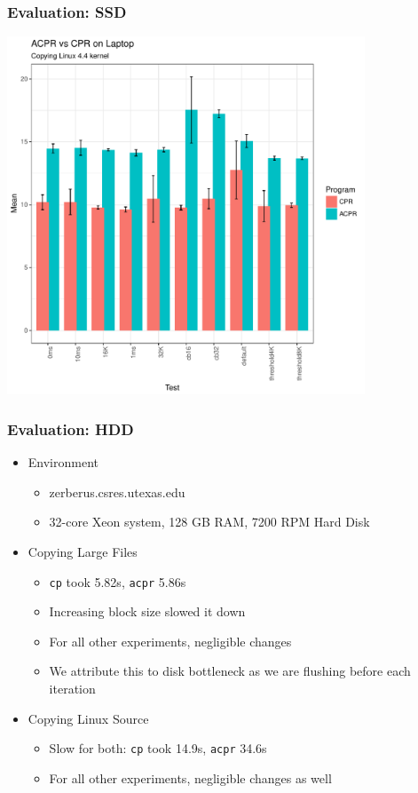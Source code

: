 \documentclass{beamer}
\begin{document}
\begin{frame}
    \frametitle{Evaluation: SSD}
    \centering
    \includegraphics[width=0.8\textwidth,height=0.8\textheight,]{Laptop_Linux_Barplot.pdf}
\end{frame}

\begin{frame}
    \frametitle{Evaluation: HDD}
    \begin{itemize}
	\item{Environment}
	    \begin{itemize}
		\item zerberus.csres.utexas.edu
		\item 32-core Xeon system, 128 GB RAM, 7200 RPM Hard Disk
	    \end{itemize}
	\item{Copying Large Files}
	    \begin{itemize}
		\item \texttt{cp} took 5.82s, \texttt{acpr} 5.86s
		\item Increasing block size slowed it down
		\item For all other experiments, negligible changes
		\item We attribute this to disk bottleneck as we are flushing before each iteration
	    \end{itemize}
	\item{Copying Linux Source}
	    \begin{itemize}
		\item Slow for both: \texttt{cp} took 14.9s, \texttt{acpr} 34.6s
		\item For all other experiments, negligible changes as well
	    \end{itemize}
    \end{itemize}
\end{frame}
\end{document}
